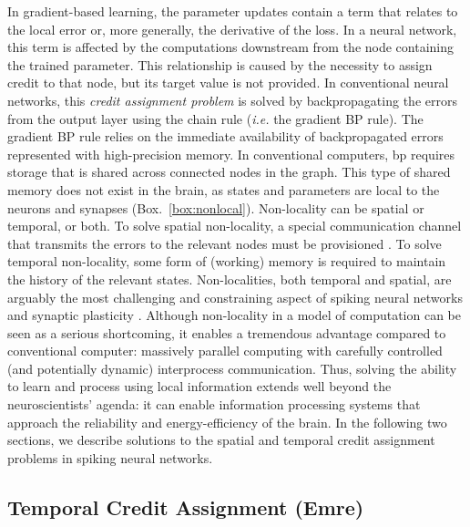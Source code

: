 \documentclass[journal,onecolumn,11pt]{IEEEtran}
\newcommand{\refbox}[1]{{\color{blue!70}(Box.~\ref{#1})}}
\begin{document}
In gradient-based learning, the parameter updates contain a term that relates to the local error or, more generally, the derivative of the loss.
In a neural network, this term is affected by the computations downstream from the node containing the trained parameter.
This relationship is caused by the necessity to assign credit to that node, but its target value is not provided.
In conventional neural networks, this \emph{credit assignment problem} is solved by backpropagating the errors from the output layer using the chain rule (\emph{i.e.} the gradient BP rule).
The gradient BP rule relies on the immediate availability of backpropagated errors represented with high-precision memory.
In conventional computers, \Gls{bp} requires storage that is shared across connected nodes in the graph.
This type of shared memory does not exist in the brain, as states and parameters are local to the neurons and synapses \refbox{box:nonlocal}.
Non-locality can be spatial or temporal, or both.
To solve spatial non-locality, a special communication channel that transmits the errors to the relevant nodes must be provisioned \cite{Baldi_Sadowski16_theoloca}. 
To solve temporal non-locality, some form of (working) memory is required to maintain the history of the relevant states. 
Non-localities, both temporal and spatial, are arguably the most challenging and constraining aspect of spiking neural networks and synaptic plasticity \cite{Neftci18_datapowe}. 
Although non-locality in a model of computation can be seen as a serious shortcoming, it enables a tremendous advantage compared to conventional computer: massively parallel computing with carefully controlled (and potentially dynamic) interprocess communication. 
Thus, solving the ability to learn and process using local information extends well beyond the neuroscientists' agenda: it can enable information processing systems that approach the reliability and energy-efficiency of the brain.
In the following two sections, we describe solutions to the spatial and temporal credit assignment problems in spiking neural networks.

\subsection{Temporal Credit Assignment (Emre)}\label{sec:temporal_CA}
\end{document}
